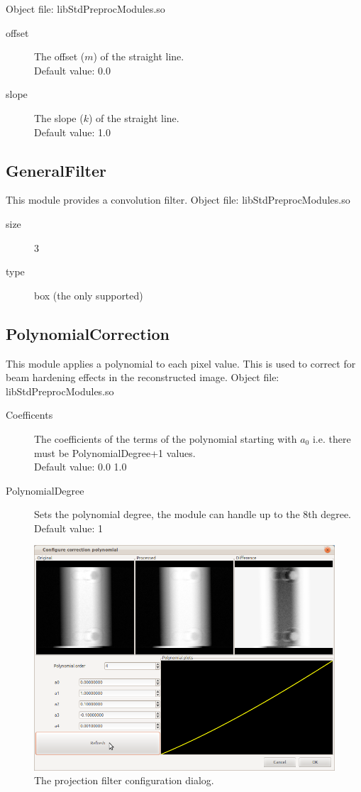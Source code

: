 \documentclass[a4paper]{scrreprt}
\begin{document}
Object file: libStdPreprocModules.so
\begin{description}
 \item[offset] The offset ($m$) of the straight line. \\Default value: 0.0
 \item[slope] The slope ($k$) of the straight line. \\Default value: 1.0
\end{description}

\subsection{GeneralFilter}
This module provides a convolution filter. 
Object file: libStdPreprocModules.so
\begin{description}
 \item[size]3
 \item[type]box (the only supported)
\end{description}

\subsection{PolynomialCorrection}
This module applies a polynomial to each pixel value. This is used to correct for beam hardening effects in the reconstructed image.
Object file: libStdPreprocModules.so
\begin{description}
 \item[Coefficents] The coefficients of the terms of the polynomial starting with $a_0$ i.e. there must be PolynomialDegree+1 values.\\ Default value: 0.0 1.0
 \item[PolynomialDegree] Sets the polynomial degree, the module can handle up to the 8th degree. \\Default value: 1
\end{description}
\begin{figure}[ht!]
\centering
\includegraphics[scale=0.5]{figures3/ConfPolyCorr.png}
\caption{The projection filter configuration dialog.}
\end{figure}
\end{document}
